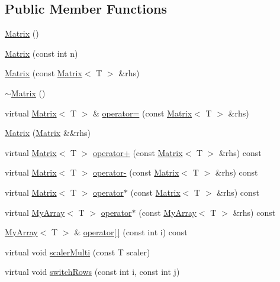 \subsection*{Public Member Functions}
\begin{DoxyCompactItemize}
\item 
\hyperlink{classMatrix_a9d567e3a121b1be0c3f9c461cab524fe}{Matrix} ()
\item 
\hyperlink{classMatrix_a19ffa179320a60ab6aeb0910f062895f}{Matrix} (const int n)
\item 
\hyperlink{classMatrix_a6a46705243036bfeee78fe2c84c54340}{Matrix} (const \hyperlink{classMatrix}{Matrix}$<$ T $>$ \&rhs)
\item 
\hyperlink{classMatrix_a91aa704de674203e96aece9e1955ccd3}{$\sim$\+Matrix} ()
\item 
virtual \hyperlink{classMatrix}{Matrix}$<$ T $>$ \& \hyperlink{classMatrix_a01990eb2552555d37c83272125be68e6}{operator=} (const \hyperlink{classMatrix}{Matrix}$<$ T $>$ \&rhs)
\item 
\hyperlink{classMatrix_ac503fc6ce19453907fd9ad85133fef39}{Matrix} (\hyperlink{classMatrix}{Matrix} \&\&rhs)
\item 
virtual \hyperlink{classMatrix}{Matrix}$<$ T $>$ \hyperlink{classMatrix_a9db4b4074daa2112eab910c7902fc5d9}{operator+} (const \hyperlink{classMatrix}{Matrix}$<$ T $>$ \&rhs) const 
\item 
virtual \hyperlink{classMatrix}{Matrix}$<$ T $>$ \hyperlink{classMatrix_a06a7f018ed353f0a8239a80ec8403be6}{operator-\/} (const \hyperlink{classMatrix}{Matrix}$<$ T $>$ \&rhs) const 
\item 
virtual \hyperlink{classMatrix}{Matrix}$<$ T $>$ \hyperlink{classMatrix_a358516deb804403fb91256a5a269d1e2}{operator$\ast$} (const \hyperlink{classMatrix}{Matrix}$<$ T $>$ \&rhs) const 
\item 
virtual \hyperlink{classMyArray}{My\+Array}$<$ T $>$ \hyperlink{classMatrix_a70c46247336f74291cc3e1b2fb800a34}{operator$\ast$} (const \hyperlink{classMyArray}{My\+Array}$<$ T $>$ \&rhs) const 
\item 
\hyperlink{classMyArray}{My\+Array}$<$ T $>$ \& \hyperlink{classMatrix_a47c3685edce37163855474b360d91202}{operator\mbox{[}$\,$\mbox{]}} (const int i) const 
\item 
virtual void \hyperlink{classMatrix_aba8c673e5ca3bcc56a9bad1a1c0fed23}{scaler\+Multi} (const T scaler)
\item 
virtual void \hyperlink{classMatrix_a23bb949d4b4256dd253808e35d73d4b9}{switch\+Rows} (const int i, const int j)

\end{DoxyCompactItemize}
